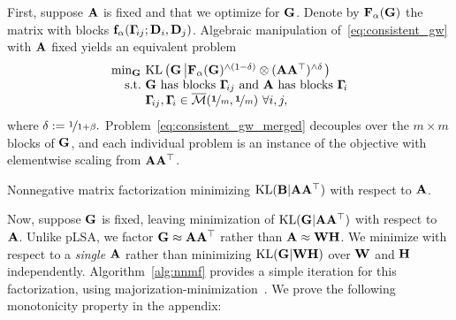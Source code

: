 First, suppose $\mathbf A$ is fixed and that we optimize for $\mathbf G$.  %
Denote by $\mathbf{F}_\alpha(\mathbf G)$ the matrix with blocks $\mathbf{f}_\alpha(\mathbf \Gamma\!_{ij};\mathbf D_i,\mathbf D_j)$.  Algebraic manipulation of~\eqref{eq:consistent_gw} with $\mathbf A$ fixed yields an equivalent problem
\begin{equation}\label{eq:consistent_gw_merged}
\begin{array}{r@{\ }l}
\min_{\bG} & \KL\left(\bG\left|\F_\alpha(\bG)^{\wedge(1-\delta)}\otimes(\bA\bA^\top)^{\wedge\delta}\right.\right)\\
\textrm{s.t.} & \bG\textrm{ has blocks }\G\!_{ij}\textrm{ and }\bA\textrm{ has blocks }\G\!_i\\
& \G\!_{ij},\G\!_i\in\bM(\nicefrac{\1}{m},\nicefrac{\1}{m})\ \forall i,j,
\end{array}
\end{equation}
where $\delta:=\nicefrac{1}{1+\beta}.$  Problem~\eqref{eq:consistent_gw_merged} decouples over the $m\!\times\!m$ blocks of $\mathbf G$, and each individual problem is an instance of the \GWa objective with elementwise scaling from $\mathbf A\mathbf A^\top$.


\begin{algorithm}[t]
\vspace{-3mm}
\caption{Nonnegative matrix factorization minimizing $\mathrm{KL}(\mathbf B|\mathbf A\mathbf A^\top)$ with respect to $\mathbf A$.\vspace{-.15in}}\label{alg:nnmf}
\end{algorithm}

Now, suppose $\mathbf G$ is fixed, leaving minimization of $\mathrm{KL}(\mathbf G|\mathbf A\mathbf A^\top)$ with respect to $\mathbf A$.  Unlike pLSA, we factor $\mathbf G\approx \mathbf A\mathbf A^\top$ rather than $\mathbf A\approx\mathbf W\mathbf H$.  We minimize with respect to a \emph{single} $\mathbf A$ rather than minimizing $\mathrm{KL}(\mathbf G|\mathbf W\mathbf H)$ over $\mathbf W$ and $\mathbf H$ independently.  Algorithm~\ref{alg:nnmf} provides a simple iteration for this factorization, using majorization-minimization~\cite{hunter-2000}.  We prove the following monotonicity property in the appendix:

